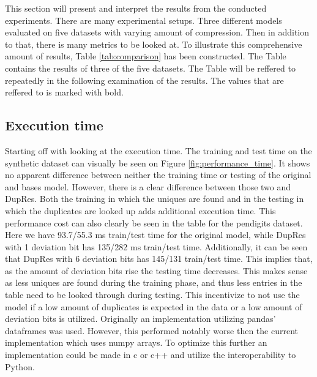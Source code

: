 


This section will present and interpret the results from the conducted experiments. There are many experimental setups. Three different models evaluated on five datasets with varying amount of compression. Then in addition to that, there is many metrics to be looked at. To illustrate this comprehensive amount of results, Table \ref{tab:comparison} has been constructed. The Table contains the results of three of the five datasets. The Table will be reffered to repeatedly in the following examination of the results. The values that are reffered to is marked with bold.

\subsection{Execution time}
Starting off with looking at the execution time. The training and test time on the synthetic dataset can visually be seen on Figure \ref{fig:performance_time}. It shows no apparent difference between neither the training time or testing of the original and bases model. However, there is a clear difference between those two and DupRes. Both the training in which the uniques are found and in the testing in which the duplicates are looked up adds additional execution time. This performance cost can also clearly be seen in the table for the pendigits dataset. Here we have 93.7/55.3 ms train/test time for the original model, while DupRes with 1 deviation bit has 135/282 ms train/test time. Additionally, it can be seen that DupRes with 6 deviation bits has 145/131 train/test time. This implies that, as the amount of deviation bits rise the testing time decreases. This makes sense as less uniques are found during the training phase, and thus less entries in the table need to be looked through during testing. This incentivize to not use the model if a low amount of duplicates is expected in the data or a low amount of deviation bits is utilized. Originally an implementation utilizing pandas'\cite{pandas} dataframes was used. However, this performed notably worse then the current implementation which uses numpy\cite{numpy} arrays. To optimize this further an implementation could be made in c or c++ and utilize the interoperability to Python.

